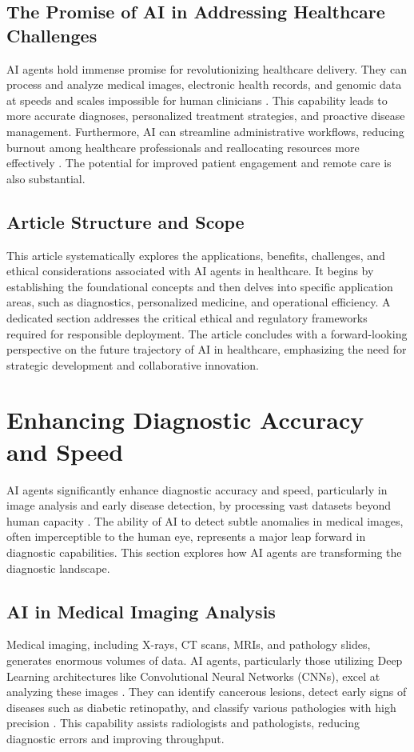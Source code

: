 \documentclass[12pt,a4paper]{article}
\begin{document}
\subsection{The Promise of AI in Addressing Healthcare Challenges}
AI agents hold immense promise for revolutionizing healthcare delivery. They can process and analyze medical images, electronic health records, and genomic data at speeds and scales impossible for human clinicians \cite{esteva2017dermatologist}. This capability leads to more accurate diagnoses, personalized treatment strategies, and proactive disease management. Furthermore, AI can streamline administrative workflows, reducing burnout among healthcare professionals and reallocating resources more effectively \cite{davenport2019ai}. The potential for improved patient engagement and remote care is also substantial.

\subsection{Article Structure and Scope}
This article systematically explores the applications, benefits, challenges, and ethical considerations associated with AI agents in healthcare. It begins by establishing the foundational concepts and then delves into specific application areas, such as diagnostics, personalized medicine, and operational efficiency. A dedicated section addresses the critical ethical and regulatory frameworks required for responsible deployment. The article concludes with a forward-looking perspective on the future trajectory of AI in healthcare, emphasizing the need for strategic development and collaborative innovation.

\section{Enhancing Diagnostic Accuracy and Speed}
AI agents significantly enhance diagnostic accuracy and speed, particularly in image analysis and early disease detection, by processing vast datasets beyond human capacity \cite{rajpurkar2017chexnet}. The ability of AI to detect subtle anomalies in medical images, often imperceptible to the human eye, represents a major leap forward in diagnostic capabilities. This section explores how AI agents are transforming the diagnostic landscape.

\subsection{AI in Medical Imaging Analysis}
Medical imaging, including X-rays, CT scans, MRIs, and pathology slides, generates enormous volumes of data. AI agents, particularly those utilizing Deep Learning architectures like Convolutional Neural Networks (CNNs), excel at analyzing these images \cite{wang2019deep}. They can identify cancerous lesions, detect early signs of diseases such as diabetic retinopathy, and classify various pathologies with high precision \cite{esteva2017dermatologist}. This capability assists radiologists and pathologists, reducing diagnostic errors and improving throughput.
\end{document}
